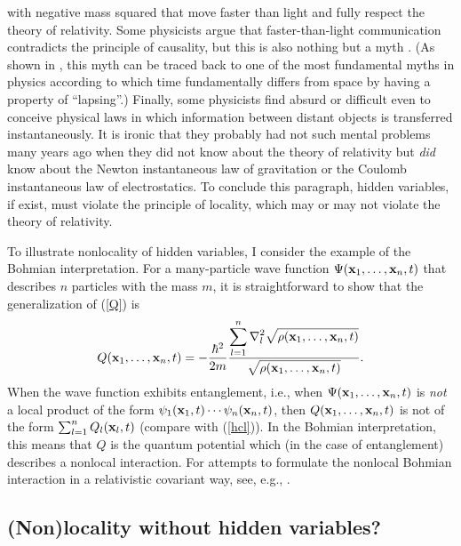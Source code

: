 \documentclass[12pt]{article}
\begin{document}
with negative mass squared 
that move faster than light and fully respect the theory of relativity.
Some physicists argue that faster-than-light communication 
contradicts the principle of causality, but this is also 
nothing but a myth \cite{liberati,nikolcaus}. (As shown in 
\cite{nikolcaus}, this myth can be traced back to one of the 
most fundamental myths in physics according to which 
time fundamentally differs from space by having a property
of ``lapsing''.)           
Finally, some physicists find absurd or difficult even to conceive 
physical laws in which information between distant objects is 
transferred instantaneously. It is ironic that they probably 
had not such mental problems many years ago when they did not know 
about the theory of relativity but {\em did} know about the 
Newton instantaneous law of gravitation or the Coulomb 
instantaneous law of electrostatics.  
To conclude this paragraph, hidden variables, if exist, must 
violate the principle of locality, which may or may not 
violate the theory of relativity. 

To illustrate nonlocality of hidden variables, 
I consider the example of the Bohmian interpretation.
For a many-particle wave function 
$\Psi({\bf x}_1,\ldots,{\bf x}_n,t)$ that describes $n$ 
particles with the mass $m$, it is 
straightforward to show that the generalization of (\ref{Q}) is
\begin{equation}\label{Qn}
Q({\bf x}_1,\ldots,{\bf x}_n,t)
= -\frac{\hbar^2}{2m} 
\displaystyle\frac{\displaystyle\sum_{l=1}^{n}
\nabla^2_l \sqrt{\rho({\bf x}_1,\ldots,{\bf x}_n,t)}}
{\sqrt{\rho({\bf x}_1,\ldots,{\bf x}_n,t)}} .
\end{equation}
When the wave function exhibits entanglement, i.e., 
when $\Psi({\bf x}_1,\ldots,{\bf x}_n,t)$ is {\em not}
a local product of the form 
$\psi_1({\bf x}_1,t)\cdots\psi_n({\bf x}_n,t)$, 
then $Q({\bf x}_1,\ldots,{\bf x}_n,t)$ is not 
of the form $\sum_{l=1}^{n}Q_l({\bf x}_l,t)$ (compare with
(\ref{hcl})). 
In the Bohmian interpretation, this means that
$Q$ is the quantum potential
which (in the case of entanglement) describes a nonlocal interaction.  
For attempts to formulate the nonlocal Bohmian interaction 
in a relativistic covariant way, see, e.g., \cite{durpra1,durpra2,
hort,nikolfpl3,nikddw,nikmft}.

\subsection{(Non)locality without hidden variables?}
\end{document}
